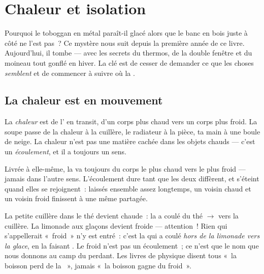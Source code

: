 \chapter{Chaleur et isolation}\label{ch:g5:heat-and-insulation}

Pourquoi le toboggan en métal paraît-il glacé alors que le banc en
bois juste à côté ne l'est pas~? Ce mystère nous suit depuis la
première année de ce livre. Aujourd'hui, il tombe --- avec les
secrets du thermos, de la double fenêtre et du moineau tout gonflé en
hiver. La clé est de cesser de demander ce que les choses
\emph{semblent} et de commencer à suivre où la  \emph{}.

\section{La chaleur est en mouvement}

\begin{definition}[Chaleur]\label{def:g5:heat-and-insulation:heat}
La \emph{chaleur} est de l' en transit, d'un
corps plus chaud vers un corps plus froid. La soupe passe de la
chaleur à la cuillère, le radiateur à la pièce, ta main à une boule
de neige. La chaleur n'est pas une matière cachée dans les objets
chauds --- c'est un \emph{écoulement}, et il a toujours un sens.
\end{definition}

\begin{proposition}\label{prop:g5:heat-and-insulation:downhill}
Livrée à elle-même, la  va toujours du corps le plus chaud
vers le plus froid --- jamais dans l'autre sens. L'écoulement dure
tant que les deux  diffèrent, et s'éteint quand elles se
rejoignent~: laissés ensemble assez longtemps, un voisin chaud et un
voisin froid finissent à une même  partagée.
\end{proposition}

\begin{example}\label{ex:g5:heat-and-insulation:direction}
La petite cuillère dans le thé devient chaude~: la  a coulé du
thé $\to$ vers la cuillère. La limonade aux glaçons devient froide
--- attention~! Rien qui s'appellerait «~froid~» n'y est entré~: c'est
la  qui a coulé \emph{hors de la limonade vers la glace}, en
la faisant . Le froid n'est pas un écoulement~; ce n'est que le
nom que nous donnons au camp du perdant. Les livres de physique
disent tous «~la boisson perd de la ~», jamais «~la boisson
gagne du froid~».
\end{example}

